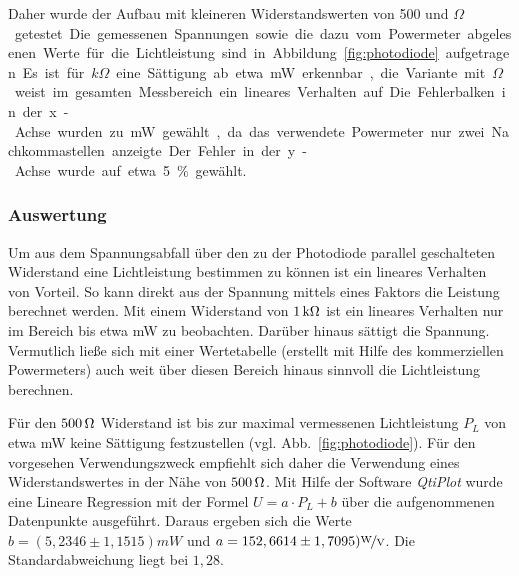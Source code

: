 Daher wurde der Aufbau mit kleineren Widerstandswerten von 500 und \unit[1000]{$\Omega$} getestet. Die gemessenen Spannungen sowie die dazu vom Powermeter abgelesenen Werte für die Lichtleistung sind in Abbildung~\ref{fig:photodiode} aufgetragen.

Es ist für \unit[1]{$k\Omega$} eine Sättigung ab etwa \unit[0,9]{mW} erkennbar, die Variante mit \unit[500]{$\Omega$} weist im gesamten Messbereich ein lineares Verhalten auf. Die Fehlerbalken in der x-Achse wurden zu \unit[0,01]{mW} gewählt, da das verwendete Powermeter nur zwei Nachkommastellen anzeigte. Der Fehler in der y-Achse wurde auf etwa 5\% gewählt.


\subsubsection*{Auswertung}

Um aus dem Spannungsabfall über den zu der Photodiode parallel geschalteten Widerstand eine Lichtleistung bestimmen zu können ist ein lineares Verhalten von Vorteil. So kann direkt aus der Spannung mittels eines Faktors die Leistung berechnet werden. Mit einem Widerstand von $\unit[1]{k\Omega}$ ist ein lineares Verhalten nur im Bereich bis etwa \unit[0,7]{mW} zu beobachten. Darüber hinaus sättigt die Spannung. Vermutlich ließe sich mit einer Wertetabelle (erstellt mit Hilfe des kommerziellen Powermeters) auch weit über diesen Bereich hinaus sinnvoll die Lichtleistung berechnen.

Für den $\unit[500]{\Omega}$ Widerstand ist bis zur maximal vermessenen Lichtleistung $P_L$ von etwa \unit[1,1]{mW} keine Sättigung festzustellen (vgl. Abb.~\ref{fig:photodiode}). Für den vorgesehen Verwendungszweck empfiehlt sich daher die Verwendung eines Widerstandswertes in der Nähe von $\unit[500]{\Omega}$. Mit Hilfe der Software \textit{QtiPlot} wurde eine Lineare Regression mit der Formel $U=a\cdot P_L + b$ über die aufgenommenen Datenpunkte ausgeführt. Daraus ergeben sich die Werte $b=(5,2346 \pm 1,1515) \unit{mW} $ und $a= 152,6614\pm 1,7095) \unitfrac{W}{V}$. Die Standardabweichung liegt bei $1,28$.\\


